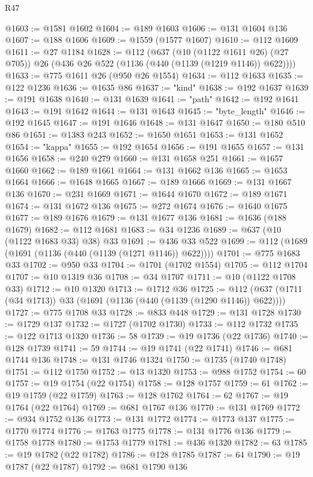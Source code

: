 \begin{lexlean}{R47}
\begin{coremodule}
@1603 := @1581 @1602
@1604 := @189 @1603
@1606 := @131 @1604 @136
@1607 := @188 @1606
@1609 := @1559 (@1577 @1607)
@1610 := @112 @1609
@1611 := @27 @1184
@1628 := @112
    (@637
      (@10 (@1122 @1611 @26) (@27 @705))
      @26
      (@436 @26 @522 (@1136 (@440 (@1139 (@1219 @1146)) @622))))
@1633 := @775 @1611 @26 (@950 @26 @1554)
@1634 := @112 @1633
@1635 := @122 @1236
@1636 := @1635 @86
@1637 := "kind"
@1638 := @192 @1637
@1639 := @191 @1638
@1640 := @131 @1639
@1641 := "path"
@1642 := @192 @1641
@1643 := @191 @1642
@1644 := @131 @1643
@1645 := "byte_length"
@1646 := @192 @1645
@1647 := @191 @1646
@1648 := @131 @1647
@1650 := @180 @510 @86
@1651 := @1383 @243
@1652 := @1650 @1651
@1653 := @131 @1652
@1654 := "kappa"
@1655 := @192 @1654
@1656 := @191 @1655
@1657 := @131 @1656
@1658 := @240 @279
@1660 := @131 @1658 @251
@1661 := @1657 @1660
@1662 := @189 @1661
@1664 := @131 @1662 @136
@1665 := @1653 @1664
@1666 := @1648 @1665
@1667 := @189 @1666
@1669 := @131 @1667 @136
@1670 := @231 @1669
@1671 := @1644 @1670
@1672 := @189 @1671
@1674 := @131 @1672 @136
@1675 := @272 @1674
@1676 := @1640 @1675
@1677 := @189 @1676
@1679 := @131 @1677 @136
@1681 := @1636 (@188 @1679)
@1682 := @112 @1681
@1683 := @34 @1236
@1689 := @637 (@10 (@1122 @1683 @33) @38) @33
@1691 := @436 @33 @522
@1699 := @112 (@1689 (@1691 (@1136 (@440 (@1139 (@1271 @1146)) @622))))
@1701 := @775 @1683 @33
@1702 := @950 @33
@1704 := @1701 (@1702 @1554)
@1705 := @112 @1704
@1707 := @10 @1319 @36
@1708 := @34 @1707
@1711 := @10 (@1122 @1708 @33)
@1712 := @10 @1320
@1713 := @1712 @36
@1725 := @112 (@637 (@1711 (@34 @1713)) @33 (@1691 (@1136 (@440 (@1139 (@1290 @1146)) @622))))
@1727 := @775 @1708 @33
@1728 := @833 @448
@1729 := @131 @1728
@1730 := @1729 @137
@1732 := @1727 (@1702 @1730)
@1733 := @112 @1732
@1735 := @122 @1713 @1320
@1736 := 58
@1739 := @19 @1736 (@22 @1736)
@1740 := @128 @1739
@1741 := 59
@1744 := @19 @1741 (@22 @1741)
@1746 := @681 @1744 @136
@1748 := @131 @1746 @1324
@1750 := @1735 (@1740 @1748)
@1751 := @112 @1750
@1752 := @13 @1320
@1753 := @988 @1752
@1754 := 60
@1757 := @19 @1754 (@22 @1754)
@1758 := @128 @1757
@1759 := 61
@1762 := @19 @1759 (@22 @1759)
@1763 := @128 @1762
@1764 := 62
@1767 := @19 @1764 (@22 @1764)
@1769 := @681 @1767 @136
@1770 := @131 @1769
@1772 := @934 @1752 @136
@1773 := @131 @1772
@1774 := @1773 @137
@1775 := @1770 @1774
@1776 := @1763 @1775
@1778 := @131 @1776 @136
@1779 := @1758 @1778
@1780 := @1753 @1779
@1781 := @436 @1320
@1782 := 63
@1785 := @19 @1782 (@22 @1782)
@1786 := @128 @1785
@1787 := 64
@1790 := @19 @1787 (@22 @1787)
@1792 := @681 @1790 @136

\end{coremodule}
\end{lexlean}
